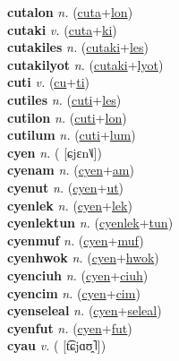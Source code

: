 \textbf{cutalon} \textit{n.} (\hyperref[cuta]{cuta}+\hyperref[lon]{lon})
 \label{cutalon} \\
\textbf{cutaki} \textit{v.} (\hyperref[cuta]{cuta}+\hyperref[ki]{ki})
 \label{cutaki} \\
\textbf{cutakiles} \textit{n.} (\hyperref[cutaki]{cutaki}+\hyperref[les]{les})
 \label{cutakiles} \\
\textbf{cutakilyot} \textit{n.} (\hyperref[cutaki]{cutaki}+\hyperref[lyot]{lyot})
 \label{cutakilyot} \\
\textbf{cuti} \textit{v.} (\hyperref[cu]{cu}+\hyperref[ti]{ti})
 \label{cuti} \\
\textbf{cutiles} \textit{n.} (\hyperref[cuti]{cuti}+\hyperref[les]{les})
 \label{cutiles} \\
\textbf{cutilon} \textit{n.} (\hyperref[cuti]{cuti}+\hyperref[lon]{lon})
 \label{cutilon} \\
\textbf{cutilum} \textit{n.} (\hyperref[cuti]{cuti}+\hyperref[lum]{lum})
 \label{cutilum} \\
\textbf{cyen} \textit{n.} ( [ɕjɛn˥˩])
 \label{cyen} \\
\textbf{cyenam} \textit{n.} (\hyperref[cyen]{cyen}+\hyperref[am]{am})
 \label{cyenam} \\
\textbf{cyenut} \textit{n.} (\hyperref[cyen]{cyen}+\hyperref[ut]{ut})
 \label{cyenut} \\
\textbf{cyenlek} \textit{n.} (\hyperref[cyen]{cyen}+\hyperref[lek]{lek})
 \label{cyenlek} \\
\textbf{cyenlektun} \textit{n.} (\hyperref[cyenlek]{cyenlek}+\hyperref[tun]{tun})
 \label{cyenlektun} \\
\textbf{cyenmuf} \textit{n.} (\hyperref[cyen]{cyen}+\hyperref[muf]{muf})
 \label{cyenmuf} \\
\textbf{cyenhwok} \textit{n.} (\hyperref[cyen]{cyen}+\hyperref[hwok]{hwok})
 \label{cyenhwok} \\
\textbf{cyenciuh} \textit{n.} (\hyperref[cyen]{cyen}+\hyperref[ciuh]{ciuh})
 \label{cyenciuh} \\
\textbf{cyencim} \textit{n.} (\hyperref[cyen]{cyen}+\hyperref[cim]{cim})
 \label{cyencim} \\
\textbf{cyenseleal} \textit{n.} (\hyperref[cyen]{cyen}+\hyperref[seleal]{seleal})
 \label{cyenseleal} \\
\textbf{cyenfut} \textit{n.} (\hyperref[cyen]{cyen}+\hyperref[fut]{fut})
 \label{cyenfut} \\
\textbf{cyau} \textit{v.} ( [t͡ɕjɑʊ̯˥])
 \label{cyau} \\
